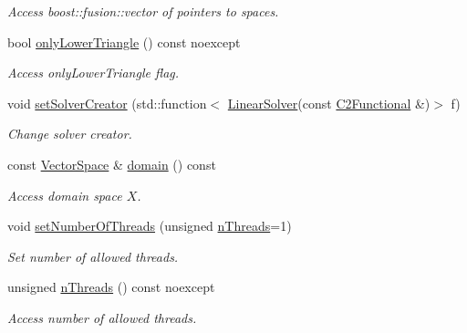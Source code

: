 \begin{DoxyCompactItemize}
\begin{DoxyCompactList}\small\item\em Access boost\+::fusion\+::vector of pointers to spaces. \end{DoxyCompactList}\item 
bool \hyperlink{classSpacy_1_1Kaskade_1_1C2Functional_a37152b2b1413e611d229a61318b86768_a37152b2b1413e611d229a61318b86768}{only\+Lower\+Triangle} () const noexcept
\begin{DoxyCompactList}\small\item\em Access only\+Lower\+Triangle flag. \end{DoxyCompactList}\item 
void \hyperlink{classSpacy_1_1Kaskade_1_1C2Functional_a3b69bdfbeec77616425096b435573094_a3b69bdfbeec77616425096b435573094}{set\+Solver\+Creator} (std\+::function$<$ \hyperlink{namespaceSpacy_a7d5cd1c6fb9dd85aa345b536caf30bba_a7d5cd1c6fb9dd85aa345b536caf30bba}{Linear\+Solver}(const \hyperlink{classSpacy_1_1Kaskade_1_1C2Functional}{C2\+Functional} \&)$>$ f)
\begin{DoxyCompactList}\small\item\em Change solver creator. \end{DoxyCompactList}\item 
const \hyperlink{classSpacy_1_1VectorSpace}{Vector\+Space} \& \hyperlink{classSpacy_1_1C2FunctionalBase_a016d11deb1525e762bdfbe7e54250718_a016d11deb1525e762bdfbe7e54250718}{domain} () const 
\begin{DoxyCompactList}\small\item\em Access domain space $X$. \end{DoxyCompactList}\item 
void \hyperlink{classSpacy_1_1Mixin_1_1NumberOfThreads_ab0c2fca77cb0d613e3bb8ce5bda11fdc_ab0c2fca77cb0d613e3bb8ce5bda11fdc}{set\+Number\+Of\+Threads} (unsigned \hyperlink{classSpacy_1_1Mixin_1_1NumberOfThreads_a385963b95b5e1ddf422393146cc71ee1_a385963b95b5e1ddf422393146cc71ee1}{n\+Threads}=1)
\begin{DoxyCompactList}\small\item\em Set number of allowed threads. \end{DoxyCompactList}\item 
unsigned \hyperlink{classSpacy_1_1Mixin_1_1NumberOfThreads_a385963b95b5e1ddf422393146cc71ee1_a385963b95b5e1ddf422393146cc71ee1}{n\+Threads} () const noexcept
\begin{DoxyCompactList}\small\item\em Access number of allowed threads. \end{DoxyCompactList}\end{DoxyCompactItemize}


